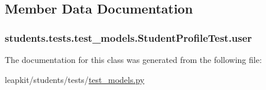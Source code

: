 \subsection{Member Data Documentation}
\hypertarget{classstudents_1_1tests_1_1test__models_1_1_student_profile_test_a500cb304853bbf13f8d667f366828573}{
\subsubsection[{user}]{\setlength{\rightskip}{0pt plus 5cm}students.\-tests.\-test\-\_\-models.\-Student\-Profile\-Test.\-user}}\label{classstudents_1_1tests_1_1test__models_1_1_student_profile_test_a500cb304853bbf13f8d667f366828573}


The documentation for this class was generated from the following file\-:\begin{DoxyCompactItemize}
\item 
leapkit/students/tests/\hyperlink{test__models_8py}{test\-\_\-models.\-py}\end{DoxyCompactItemize}
